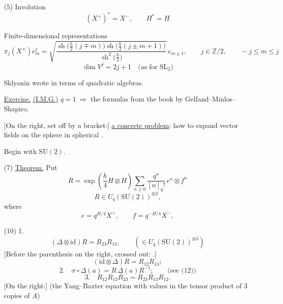 
(5) Involution
\begin{equation*}
(X^+)^*=X^-,\qquad H^*=H
\end{equation*}

Finite-dimensional representations
\begin{equation*}
\pi_j(X^{\pm})e_m^j=
\sqrt{\frac{\operatorname{sh}\bigl(\frac h2(j\mp m)\bigr)
\operatorname{sh}\bigl(\frac h2(j\pm m+1)\bigr)}
{\operatorname{sh}^{2}\bigl(\frac h2\bigr)}}\,e_{m\pm1},
\qquad j\in\mathbb Z/2,
\qquad -j\le m\le j
\tag{6}
\end{equation*}
\begin{equation*}
\dim V^j=2j+1\quad\text{(as for $\mathrm{SL}_2$)}
\end{equation*}

Sklyanin wrote in terms of quadratic algebras.

\underline{Exercise.} \underline{(I.M.G.)} $q=1\ \Rightarrow$ the formulas from the book by Gelfand--Minlos--Shapiro.

[On the right, set off by a bracket:] \underline{a concrete problem}: how to expand vector fields on the sphere in spherical .

Begin with $\mathrm{SU}(2)$.

(7) \underline{Theorem.} Put
\begin{equation*}
R=\exp\left(\frac h4 H\otimes H\right)
\sum_{n\ge0}\frac{q^n}{[n]_q!}\,e^n\otimes f^n
\tag{8}
\end{equation*}
\begin{equation*}
R\in U_q(\mathrm{SU}(2))^{\otimes2},
\end{equation*}
where
\begin{equation*}
e=q^{H/4}X^+,\qquad f=q^{-H/4}X^-,
\tag{9}
\end{equation*}

(10) 1.
\begin{equation*}
(\Delta\otimes\mathrm{id})R=R_{23}R_{13},
\qquad (\in U_q(\mathrm{SU}(2))^{\otimes3})
\end{equation*}
[Before the parenthesis on the right, crossed out: .]
\begin{equation*}
(\mathrm{id}\otimes\Delta)R=R_{12}R_{13};
\end{equation*}
\begin{equation*}
2.\quad \sigma\circ\Delta(a)=R\,\Delta(a)R^{-1};\qquad\text{(see (12))}
\end{equation*}
\begin{equation*}
3.\quad R_{12}R_{13}R_{23}=R_{23}R_{13}R_{12}.
\end{equation*}
[On the right:] (the Yang--Baxter equation with values in the tensor product of 3 copies of $A$)

